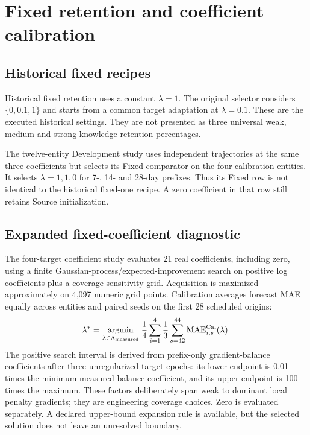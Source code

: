 \documentclass[pdflatex,iicol,sn-mathphys-num]{sn-jnl}
\begin{document}
\section{Fixed retention and coefficient calibration}
\subsection{Historical fixed recipes}
Historical fixed retention uses a constant $\lambda=1$. The original selector considers $\{0,0.1,1\}$ and starts from a common target adaptation at $\lambda=0.1$. These are the executed historical settings. They are not presented as three universal weak, medium and strong knowledge-retention percentages.

The twelve-entity Development study uses independent trajectories at the same three coefficients but selects its Fixed comparator on the four calibration entities. It selects $\lambda=1,1,0$ for 7-, 14- and 28-day prefixes. Thus its Fixed row is not identical to the historical fixed-one recipe. A zero coefficient in that row still retains Source initialization.

\subsection{Expanded fixed-coefficient diagnostic}
The four-target coefficient study evaluates 21 real coefficients, including zero, using a finite Gaussian-process/expected-improvement search on positive log coefficients plus a coverage sensitivity grid. Acquisition is maximized approximately on 4,097 numeric grid points. Calibration averages forecast MAE equally across entities and paired seeds on the first 28 scheduled origins:
\begin{equation}
\lambda^*=\underset{\lambda\in\Lambda_{\rm measured}}{\operatorname{argmin}}\;
\frac{1}{4}\sum_{i=1}^4\frac{1}{3}\sum_{s=42}^{44}
\operatorname{MAE}^{\rm Cal}_{i,s}(\lambda).
\label{eq:fixedselection}
\end{equation}
The positive search interval is derived from prefix-only gradient-balance coefficients after three unregularized target epochs: its lower endpoint is 0.01 times the minimum measured balance coefficient, and its upper endpoint is 100 times the maximum. These factors deliberately span weak to dominant local penalty gradients; they are engineering coverage choices. Zero is evaluated separately. A declared upper-bound expansion rule is available, but the selected solution does not leave an unresolved boundary.
\end{document}
